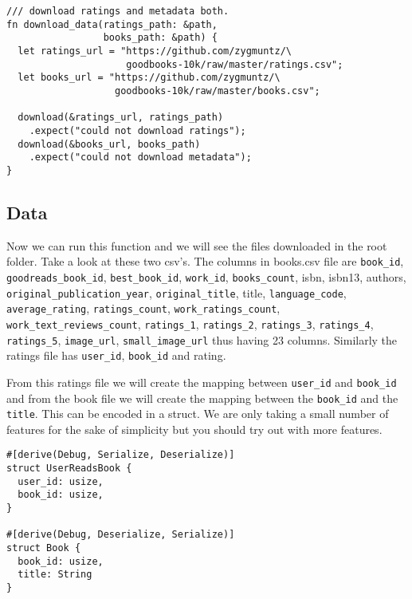 \documentclass{book}
\begin{document}
\begin{lstlisting}[caption={chapter7/goodbooks-recommender/cargo.toml}, basicstyle=\small]
/// download ratings and metadata both.
fn download_data(ratings_path: &path,
                 books_path: &path) {
  let ratings_url = "https://github.com/zygmuntz/\
                     goodbooks-10k/raw/master/ratings.csv";
  let books_url = "https://github.com/zygmuntz/\
                   goodbooks-10k/raw/master/books.csv";

  download(&ratings_url, ratings_path)
    .expect("could not download ratings");
  download(&books_url, books_path)
    .expect("could not download metadata");
}
\end{lstlisting}
\label{sub:Dowloading data}


\subsection{Data}%
Now we can run this function and we will see the files downloaded in the root folder. Take a look at these two csv's. The columns in books.csv file are \lstinline{book_id}, \lstinline{goodreads_book_id}, \lstinline{best_book_id}, \lstinline{work_id}, \lstinline{books_count}, isbn, isbn13, authors, \lstinline{original_publication_year}, \lstinline{original_title}, title, \lstinline{language_code}, \lstinline{average_rating}, \lstinline{ratings_count}, \lstinline{work_ratings_count}, \lstinline{work_text_reviews_count}, \lstinline{ratings_1}, \lstinline{ratings_2}, \lstinline{ratings_3}, \lstinline{ratings_4}, \lstinline{ratings_5}, \lstinline{image_url}, \lstinline{small_image_url} thus having 23 columns. Similarly the ratings file has \lstinline{user_id},  \lstinline{book_id} and rating.

From this ratings file we will create the mapping between \lstinline{user_id} and \lstinline{book_id} and from the book file we will create the mapping between the \lstinline{book_id} and the \lstinline{title}. This can be encoded in a struct. We are only taking a small number of features for the sake of simplicity but you should try out with more features.

\begin{lstlisting}[caption={chapter7/goodbooks-recommender/src/main.rs}, basicstyle=\small]
#[derive(Debug, Serialize, Deserialize)]
struct UserReadsBook {
  user_id: usize,
  book_id: usize,
}

#[derive(Debug, Deserialize, Serialize)]
struct Book {
  book_id: usize,
  title: String
}
\end{lstlisting}
\end{document}
